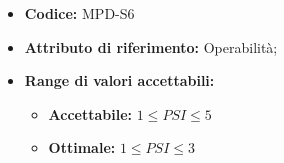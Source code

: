 \begin{itemize}
    \item \textbf{Codice:} MPD-S6
    \item \textbf{Attributo di riferimento:} Operabilità;
    \item \textbf{Range di valori accettabili:} 
     \begin{itemize}
        \item \textbf{Accettabile:} $1 \leq PSI \leq 5$ 
        \item \textbf{Ottimale:} $1 \leq PSI \leq 3$
        
    \end{itemize}
\end{itemize}

